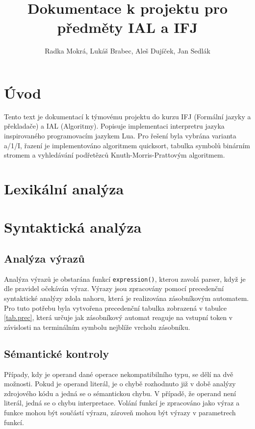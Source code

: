 \documentclass[a4paper,11pt,titlepage]{article}
\author{Radka Mokrá, Lukáš Brabec, Aleš Dujíček, Jan Sedlák}
\title{Dokumentace k projektu pro předměty IAL a IFJ}
\begin{document}


\tableofcontents

\newpage

\section{Úvod}
Tento text je dokumentací k týmovému projektu do kurzu IFJ (Formální jazyky a překladače) a IAL (Algoritmy). Popisuje implementaci interpretru jazyka inspirovaného programovacím jazykem Lua. Pro řešení byla vybrána varianta a/1/I, řazení je implementováno algoritmem quicksort, tabulka symbolů binárním stromem a vyhledávání podřetězců Knuth-Morris-Prat\-to\-vým algoritmem.

\section{Lexikální analýza}


\section{Syntaktická analýza}




\subsection{Analýza výrazů}
Analýza výrazů je obstarána funkcí {\tt expression()}, kterou zavolá parser, když je dle pravidel očekáván výraz. Výrazy jsou zpracovány pomocí precedenční syntaktické analýzy zdola nahoru, která je realizována zásobníkovým automatem. Pro tuto potřebu byla vytvořena precedenční tabulka zobrazená v tabulce \ref{tab.prec}, která určuje jak zásobníkový automat reaguje na vstupní token v závislosti na terminálním symbolu nejblíže vrcholu zásobníku.



\subsection{Sémantické kontroly}
Případy, kdy je operand dané operace nekompatibilního typu, se dělí na dvě možnosti. Pokud je operand literál, je o chybě rozhodnuto již v době analýzy zdrojového kódu a jedná se o sémantickou chybu. V případě, že operand není literál, jedná se o chybu interpretace. 
Volání funkcí je zpracováno jako výraz a funkce mohou být součástí výrazu, zároveň mohou být výrazy v parametrech funkcí.
\end{document}
